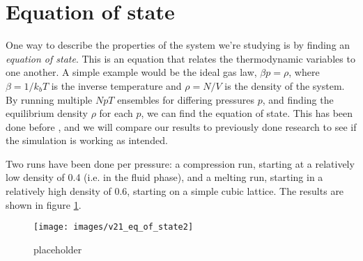 \documentclass[thesis]{subfiles}
\begin{document}
\section{Equation of state}

One way to describe the properties of the system we're studying is by finding an \emph{equation of state}. This is an equation that relates the thermodynamic variables to one another. A simple example would be the ideal gas law, $\beta p = \rho$, where $\beta = 1/k_bT$ is the inverse temperature and $\rho = N/V$ is the density of the system. By running multiple $NpT$ ensembles for differing pressures $p$, and finding the equilibrium density $\rho$ for each $p$, we can find the equation of state. This has been done before \cite{van2017phase}, and we will compare our results to previously done research to see if the simulation is working as intended. \bigbreak

Two runs have been done per pressure: a compression run, starting at a relatively low density of 0.4 (i.e. in the fluid phase), and a melting run, starting in a relatively high density of 0.6, starting on a simple cubic lattice. The results are shown in figure \ref{fig:eos}. 

\begin{figure}
	\centering
	\texttt{[image: images/v21\_eq\_of\_state2]}
	\caption{placeholder}
	\label{fig:eos}
\end{figure}
\end{document}
